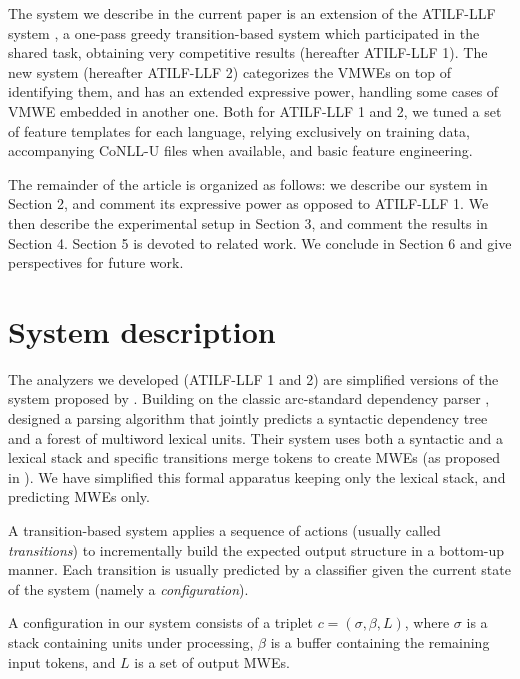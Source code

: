 \documentclass[output=paper,modfonts]{langscibook}
\begin{document}
The system we describe in the current paper is an extension of the ATILF-LLF system \citep{W17-1717}, a one-pass greedy transition-based system which participated in the shared task, obtaining very competitive results (hereafter ATILF-LLF 1). The new system (hereafter ATILF-LLF 2) categorizes the VMWEs on top of identifying them, and has an extended expressive power, handling some cases of VMWE embedded in another one. Both for ATILF-LLF 1 and 2, we tuned a set of feature templates for each language, relying exclusively on training data, accompanying CoNLL-U files when available, and basic feature engineering.

The remainder of the article is organized as follows: we describe our system in Section 2, and comment its expressive power as opposed to ATILF-LLF 1. We then describe the experimental setup in Section 3, and comment the results in Section 4. Section 5 is devoted to related work. We conclude in Section 6 and give perspectives for future work. 

\section{System description}

The analyzers we developed (ATILF-LLF 1 and 2) are simplified versions of the system proposed by \citet{constant-nivre:acl:2016}. Building on the classic arc-standard dependency parser \citep{nivre04acl}, \citet{constant-nivre:acl:2016} designed a parsing algorithm that jointly predicts a syntactic dependency tree and a forest of multiword lexical units. Their system uses both a syntactic and a lexical stack and specific transitions merge tokens to create MWEs (as proposed in \citet{Nivre14}). We have simplified this formal apparatus keeping only the lexical stack, and predicting MWEs only.

A transition-based system applies a sequence of actions (usually called \emph{transitions}) to incrementally build the expected output structure in a bottom-up manner. Each transition is usually predicted by a classifier given the current state of the system (namely a \emph{configuration}).

A configuration in our system consists of a triplet $c = (\sigma, \beta, L)$, where $\sigma$ is a stack containing units under processing, $\beta$ is a buffer containing the remaining input tokens, and $L$ is a set of output MWEs.
\end{document}
